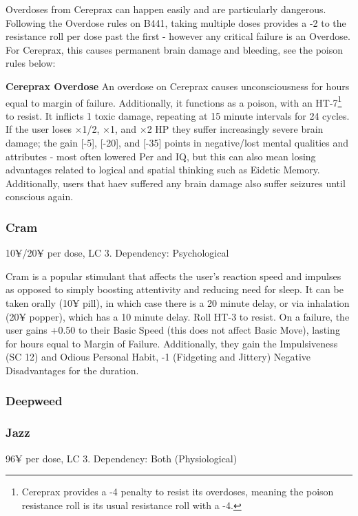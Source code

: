 Overdoses from Cereprax can happen easily and are particularly dangerous. Following the Overdose rules on B441, taking multiple doses provides a -2 to the resistance roll per dose past the first - however any critical failure is an Overdose. For Cereprax, this causes permanent brain damage and bleeding, see the poison rules below:

\textbf{Cereprax Overdose} An overdose on Cereprax causes unconsciousness for hours equal to margin of failure. Additionally, it functions as a poison, with an HT-7\footnote{Cereprax provides a -4 penalty to resist its overdoses, meaning the poison resistance roll is its usual resistance roll with a -4.} to resist. It inflicts 1 toxic damage, repeating at 15 minute intervals for 24 cycles. If the user loses $\times$1/2, $\times$1, and $\times$2 HP they suffer increasingly severe brain damage; the gain [-5], [-20], and [-35] points in negative/lost mental qualities and attributes - most often lowered Per and IQ, but this can also mean losing advantages related to logical and spatial thinking such as Eidetic Memory. Additionally, users that haev suffered any brain damage also suffer seizures until conscious again.

\subsubsection{Cram}
\begin{flushleft}
	10¥/20¥ per dose, LC 3. 
	Dependency: Psychological
\end{flushleft}

Cram is a popular stimulant that affects the user's reaction speed and impulses as opposed to simply boosting attentivity and reducing need for sleep. It can be taken orally (10¥ pill), in which case there is a 20 minute delay, or via inhalation (20¥ popper), which has a 10 minute delay. Roll HT-3 to resist. On a failure, the user gains +0.50 to their Basic Speed (this does not affect Basic Move), lasting for hours equal to Margin of Failure. Additionally, they gain the Impulsiveness (SC 12) and Odious Personal Habit, -1 (Fidgeting and Jittery) Negative Disadvantages for the duration.

\subsubsection{Deepweed}


\subsubsection{Jazz}
\begin{flushleft}
	96¥ per dose, LC 3. 
	Dependency: Both (Physiological)
\end{flushleft}

